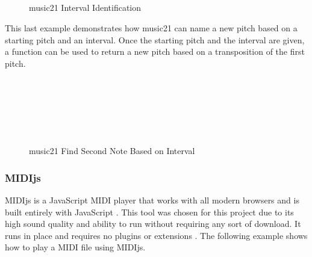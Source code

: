 \begin{figure}[!htbp]
	\caption{music21 Interval Identification \cite{Cuthbert_2020}}
	 \\
	 \\
	 \\
	 \\
	 \\
	 \\
	 \\
	 \\
	 \\
\end{figure}

This last example demonstrates how music21 can name a new pitch based on a starting pitch and an interval.  Once the starting pitch and the interval are given, a function can be used to return a new pitch based on a transposition of the first pitch.

\begin{figure}[!htbp]
	\caption{music21 Find Second Note Based on Interval \cite{Cuthbert_2020}}
	 \\
	 \\
	 \\
	 \\
	 \\
\end{figure}

\subsubsection{MIDIjs}
\label{subsubsec:midijs}

MIDIjs is a JavaScript MIDI player that works with all modern browsers and is built entirely with JavaScript \cite{MIDIjs_ND}.  This tool was chosen for this project due to its high sound quality and ability to run without requiring any sort of download.  It runs in place and requires no plugins or extensions \cite{MIDIjs_ND}.  The following example shows how to play a MIDI file using MIDIjs.

